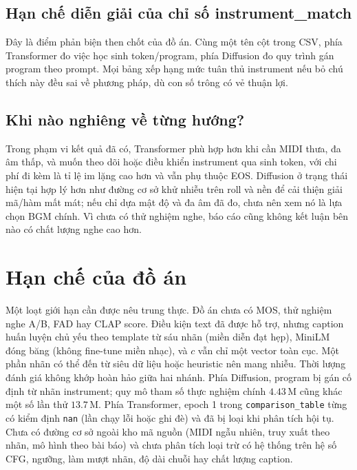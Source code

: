 \subsection{Hạn chế diễn giải của chỉ số instrument\_match}

Đây là điểm phản biện then chốt của đồ án. Cùng một tên cột trong CSV, phía Transformer đo việc học sinh token/program, phía Diffusion đo quy trình gán program theo prompt. Mọi bảng xếp hạng mức tuân thủ instrument nếu bỏ chú thích này đều sai về phương pháp, dù con số trông có vẻ thuận lợi.

\subsection{Khi nào nghiêng về từng hướng?}

Trong phạm vi kết quả đã có, Transformer phù hợp hơn khi cần MIDI thưa, đa âm thấp, và muốn theo dõi hoặc điều khiển instrument qua sinh token, với chi phí đi kèm là tỉ lệ im lặng cao hơn và vẫn phụ thuộc EOS. Diffusion ở trạng thái hiện tại hợp lý hơn như đường cơ sở khử nhiễu trên roll và nền để cải thiện giải mã/hàm mất mát; nếu chỉ dựa mật độ và đa âm đã đo, chưa nên xem nó là lựa chọn BGM chính. Vì chưa có thử nghiệm nghe, báo cáo cũng không kết luận bên nào có chất lượng nghe cao hơn.

\section{Hạn chế của đồ án}
\label{sec:ch4-limitations}

Một loạt giới hạn cần được nêu trung thực. Đồ án chưa có MOS, thử nghiệm nghe A/B, FAD hay CLAP score. Điều kiện text đã được hỗ trợ, nhưng caption huấn luyện chủ yếu theo template từ sáu nhãn (miền diễn đạt hẹp), MiniLM đóng băng (không fine-tune miền nhạc), và $c$ vẫn chỉ một vector toàn cục. Một phần nhãn có thể đến từ siêu dữ liệu hoặc heuristic nên mang nhiễu. Thời lượng đánh giá không khớp hoàn hảo giữa hai nhánh. Phía Diffusion, program bị gán cố định từ nhãn instrument; quy mô tham số thực nghiệm chính $4.43$\,M cũng khác một số lần thử $13.7$\,M. Phía Transformer, epoch 1 trong \texttt{comparison\_table} từng có kiểm định \texttt{nan} (lần chạy lỗi hoặc ghi đè) và đã bị loại khi phân tích hội tụ. Chưa có đường cơ sở ngoài kho mã nguồn (MIDI ngẫu nhiên, truy xuất theo nhãn, mô hình theo bài báo) và chưa phân tích loại trừ có hệ thống trên hệ số CFG, ngưỡng, làm mượt nhãn, độ dài chuỗi hay chất lượng caption.

